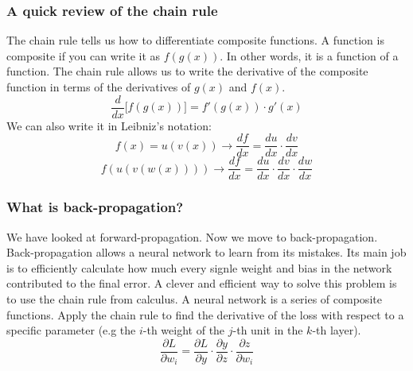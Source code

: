 \documentclass[11pt]{article}
\begin{document}
\subsubsection{A quick review of the chain rule}
The chain rule tells us how to differentiate composite functions. A function is composite if you can write it as $f(g(x))$.
In other words, it is a function of a function. The chain rule allows us to write the derivative of the composite function in terms of the derivatives of $g(x)$ and $f(x)$.
$$
\boxed{\frac{d}{dx}\big[f(g(x))\big]=f'(g(x))\cdot g'(x)}
$$
We can also write it in Leibniz's notation:
$$
f(x)=u(v(x)) \to \frac{df}{dx}=\frac{du}{dx}\cdot \frac{dv}{dx}
$$
$$
f(u(v(w(x)))) \to \frac{df}{dx}=\frac{du}{dx}\cdot\frac{dv}{dx}\cdot\frac{dw}{dx}
$$

\subsubsection{What is back-propagation?}
We have looked at forward-propagation. Now we move to back-propagation.
Back-propagation allows a neural network to learn from its mistakes. Its main job is to efficiently calculate how much every signle weight and bias in the network contributed to the final error.
A clever and efficient way to solve this problem is to use the chain rule from calculus.
A neural network is a series of composite functions. Apply the chain rule to find the derivative of the loss with respect to a specific parameter (e.g the $i$-th weight of the $j$-th unit in the $k$-th layer).
$$
\frac{\partial L}{\partial w_i}=\frac{\partial L}{\partial y}\cdot\frac{\partial y}{\partial z}\cdot\frac{\partial z}{\partial w_i}
$$
\end{document}
